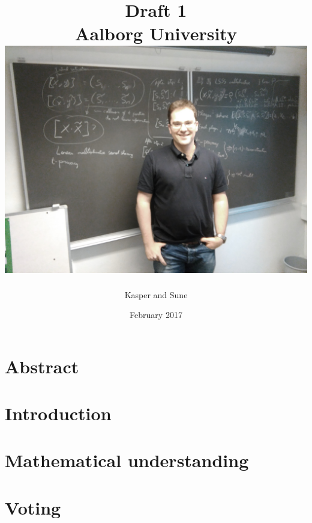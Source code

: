 \documentclass[a4paper]{report}
\title{
    Draft 1 \\
	Aalborg University \\
    \includegraphics[scale=0.1]{Ignacio.jpg}
}
\author{Kasper and  Sune}
\date{February 2017}
\theoremstyle{plain}
\begin{document}
\maketitle
\clearpage

\chapter*{Abstract}

\clearpage

\tableofcontents
\clearpage


\chapter{Introduction}
    
    
    
    
    
    
    
    
    

\clearpage
\chapter{Mathematical understanding}
    
    
    
    
    
    
    
    
    
    
    
    
    
    
 \clearpage
\chapter{Voting}    
    
    
\end{document}
